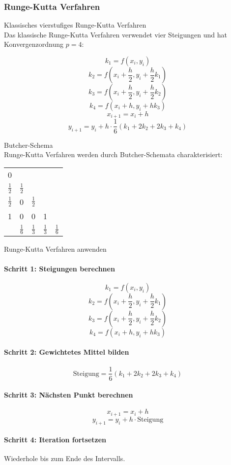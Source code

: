 \subsubsection{Runge-Kutta Verfahren}

\begin{theorem}{Klassisches vierstufiges Runge-Kutta Verfahren}\\
Das klassische Runge-Kutta Verfahren verwendet vier Steigungen und hat Konvergenzordnung $p = 4$:

$$k_1 = f(x_i, y_i)$$
$$k_2 = f\left(x_i + \frac{h}{2}, y_i + \frac{h}{2} k_1\right)$$
$$k_3 = f\left(x_i + \frac{h}{2}, y_i + \frac{h}{2} k_2\right)$$
$$k_4 = f(x_i + h, y_i + h k_3)$$
$$x_{i+1} = x_i + h$$
$$y_{i+1} = y_i + h \cdot \frac{1}{6}(k_1 + 2k_2 + 2k_3 + k_4)$$
\end{theorem}

\begin{concept}{Butcher-Schema}\\
Runge-Kutta Verfahren werden durch Butcher-Schemata charakterisiert:
\begin{center}
\begin{tabular}{c|cccc}
0 & & & & \\
$\frac{1}{2}$ & $\frac{1}{2}$ & & & \\
$\frac{1}{2}$ & 0 & $\frac{1}{2}$ & & \\
1 & 0 & 0 & 1 & \\
\hline
& $\frac{1}{6}$ & $\frac{1}{3}$ & $\frac{1}{3}$ & $\frac{1}{6}$
\end{tabular}
\end{center}
\end{concept}

\begin{KR}{Runge-Kutta Verfahren anwenden}\\
\paragraph{Schritt 1: Steigungen berechnen}
$$k_1 = f(x_i, y_i)$$
$$k_2 = f\left(x_i + \frac{h}{2}, y_i + \frac{h}{2} k_1\right)$$
$$k_3 = f\left(x_i + \frac{h}{2}, y_i + \frac{h}{2} k_2\right)$$
$$k_4 = f(x_i + h, y_i + h k_3)$$

\paragraph{Schritt 2: Gewichtetes Mittel bilden}
$$\text{Steigung} = \frac{1}{6}(k_1 + 2k_2 + 2k_3 + k_4)$$

\paragraph{Schritt 3: Nächsten Punkt berechnen}
$$x_{i+1} = x_i + h$$
$$y_{i+1} = y_i + h \cdot \text{Steigung}$$

\paragraph{Schritt 4: Iteration fortsetzen}
Wiederhole bis zum Ende des Intervalls.
\end{KR}

